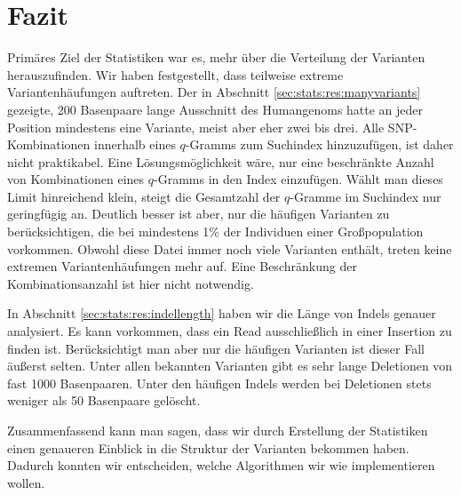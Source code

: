 \section{Fazit}

Primäres Ziel der Statistiken war es, mehr über die Verteilung der Varianten herauszufinden. Wir haben festgestellt, dass teilweise extreme Variantenhäufungen auftreten. Der in Abschnitt \ref{sec:stats:res:manyvariants} gezeigte, 200 Basenpaare lange Ausschnitt des Humangenoms hatte an jeder Position mindestens eine Variante, meist aber eher zwei bis drei. Alle SNP-Kombinationen innerhalb eines $q$-Gramms zum Suchindex hinzuzufügen, ist daher nicht praktikabel. Eine Lösungsmöglichkeit wäre, nur eine beschränkte Anzahl von Kombinationen eines $q$-Gramms in den Index einzufügen. Wählt man dieses Limit hinreichend klein, steigt die Gesamtzahl der $q$-Gramme im Suchindex nur geringfügig an. Deutlich besser ist aber, nur die häufigen Varianten zu berücksichtigen, die bei mindestens 1\% der Individuen einer Großpopulation vorkommen. Obwohl diese Datei immer noch viele Varianten enthält, treten keine extremen Variantenhäufungen mehr auf. Eine Beschränkung der Kombinationsanzahl ist hier nicht notwendig.

In Abschnitt \ref{sec:stats:res:indellength} haben wir die Länge von Indels genauer analysiert. Es kann vorkommen, dass ein Read ausschließlich in einer Insertion zu finden ist. Berücksichtigt man aber nur die häufigen Varianten ist dieser Fall äußerst selten. Unter allen bekannten Varianten gibt es sehr lange Deletionen von fast 1000 Basenpaaren. Unter den häufigen Indels werden bei Deletionen stets weniger als 50 Basenpaare gelöscht.

Zusammenfassend kann man sagen, dass wir durch Erstellung der Statistiken einen genaueren Einblick in die Struktur der Varianten bekommen haben. Dadurch konnten wir entscheiden, welche Algorithmen wir wie implementieren wollen.